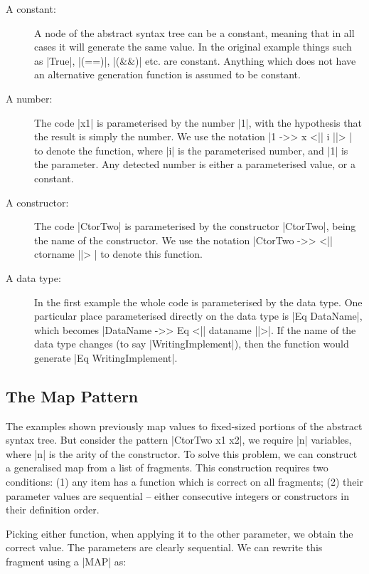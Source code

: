 \documentclass{llncs}
\begin{document}
\begin{description}
\item[A constant:] A node of the abstract syntax tree can be a constant, meaning that in all cases it will generate the same value. In the original example things such as |True|, |(==)|, |(&&)| etc. are constant. Anything which does not have an alternative generation function is assumed to be constant.

\item[A number:] The code |x1| is parameterised by the number |1|, with the hypothesis that the result is simply the number. We use the notation |1 ->> x <|| i ||> | to denote the function, where |i| is the parameterised number, and |1| is the parameter. Any detected number is either a parameterised value, or a constant.

\item[A constructor:] The code |CtorTwo| is parameterised by the constructor |CtorTwo|, being the name of the constructor. We use the notation |CtorTwo ->> <|| ctorname ||> | to denote this function.

\item[A data type:] In the first example the whole code is parameterised by the data type. One particular place parameterised directly on the data type is |Eq DataName|, which becomes |DataName ->> Eq <|| dataname ||>|. If the name of the data type changes (to say |WritingImplement|), then the function would generate |Eq WritingImplement|.
\end{description}

\subsection{The Map Pattern}
\label{sec:induction}

The examples shown previously map values to fixed-sized portions of the abstract syntax tree. But consider the pattern |CtorTwo x1 x2|, we require |n| variables, where |n| is the arity of the constructor. To solve this problem, we can construct a generalised map from a list of fragments. This construction requires two conditions: (1) any item has a function which is correct on all fragments; (2) their parameter values are sequential -- either consecutive integers or constructors in their definition order.

\begin{code}
[1 ->> x <| i |>, 2 ->> x <| i |>]
\end{code}

Picking either function, when applying it to the other parameter, we obtain the correct value. The parameters are clearly sequential. We can rewrite this fragment using a |MAP| as:
\end{document}
